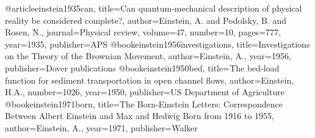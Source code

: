@article{einstein1935can,
  title={Can quantum-mechanical description of physical reality be considered complete?},
  author={Einstein, A. and Podolsky, B. and Rosen, N.},
  journal={Physical review},
  volume={47},
  number={10},
  pages={777},
  year={1935},
  publisher={APS}
}
@book{einstein1956investigations,
  title={Investigations on the Theory of the Brownian Movement},
  author={Einstein, A.},
  year={1956},
  publisher={Dover publications}
}
@book{einstein1950bed,
  title={The bed-load function for sediment transportation in open channel flows},
  author={Einstein, H.A.},
  number={1026},
  year={1950},
  publisher={US Department of Agriculture}
}
@book{einstein1971born,
  title={The Born-Einstein Letters: Correspondence Between Albert Einstein and Max and Hedwig Born from 1916 to 1955},
  author={Einstein, A.},
  year={1971},
  publisher={Walker}
}